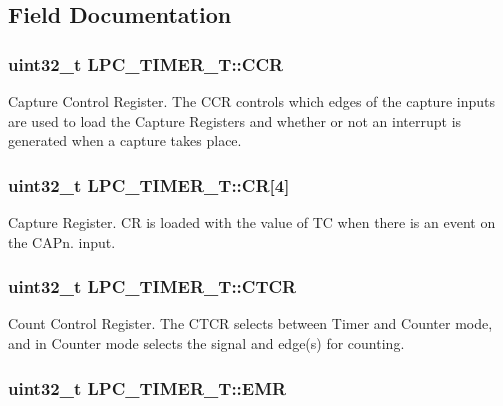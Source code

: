 \subsection{Field Documentation}
\hypertarget{structLPC__TIMER__T_ae97a68e845ea92e8c617bbdf1d867e48}{
\subsubsection[{C\-C\-R}]{ uint32\-\_\-t L\-P\-C\-\_\-\-T\-I\-M\-E\-R\-\_\-\-T\-::\-C\-C\-R}}\label{structLPC__TIMER__T_ae97a68e845ea92e8c617bbdf1d867e48}
Capture Control Register. The C\-C\-R controls which edges of the capture inputs are used to load the Capture Registers and whether or not an interrupt is generated when a capture takes place. \hypertarget{structLPC__TIMER__T_aa352dc65884c0a7b8888736a90a4bb7b}{
\subsubsection[{C\-R}]{ uint32\-\_\-t L\-P\-C\-\_\-\-T\-I\-M\-E\-R\-\_\-\-T\-::\-C\-R\mbox{[}4\mbox{]}}}\label{structLPC__TIMER__T_aa352dc65884c0a7b8888736a90a4bb7b}
Capture Register. C\-R is loaded with the value of T\-C when there is an event on the C\-A\-Pn. input. \hypertarget{structLPC__TIMER__T_a8bee15636f5bce5c6d3f3fcd4d8cf513}{
\subsubsection[{C\-T\-C\-R}]{ uint32\-\_\-t L\-P\-C\-\_\-\-T\-I\-M\-E\-R\-\_\-\-T\-::\-C\-T\-C\-R}}\label{structLPC__TIMER__T_a8bee15636f5bce5c6d3f3fcd4d8cf513}
Count Control Register. The C\-T\-C\-R selects between Timer and Counter mode, and in Counter mode selects the signal and edge(s) for counting. \hypertarget{structLPC__TIMER__T_a92df4dc0b947774e8cf040b5c2c2ae30}{
\subsubsection[{E\-M\-R}]{ uint32\-\_\-t L\-P\-C\-\_\-\-T\-I\-M\-E\-R\-\_\-\-T\-::\-E\-M\-R}}\label{structLPC__TIMER__T_a92df4dc0b947774e8cf040b5c2c2ae30}
